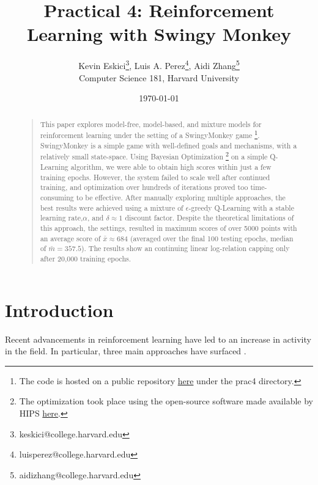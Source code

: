 \documentclass[letterpaper]{article}
\title{Practical 4: Reinforcement Learning with Swingy Monkey}
\author{Kevin Eskici\thanks{keskici@college.harvard.edu}, Luis A. Perez\thanks{luisperez@college.harvard.edu}, Aidi Zhang\thanks{aidizhang@college.harvard.edu} \\
Computer Science 181, Harvard University}
\date{\today}
\begin{document}
\maketitle

\begin{abstract}
\begin{quote}
This paper explores model-free, model-based, and mixture models for reinforcement learning under the setting of a SwingyMonkey game \footnote{The code is hosted on a public repository \href{https://github.com/kandluis/machine-learning}{here} under the prac4 directory.}. SwingyMonkey is a simple game with well-defined goals and mechanisms, with a relatively small state-space. Using Bayesian Optimization \footnote{The optimization took place using the open-source software made available by HIPS \href{https://github.com/HIPS/Spearmint}{here}.} on a simple Q-Learning algorithm, we were able to obtain high scores within just a few training epochs. However, the system failed to scale well after continued training, and optimization over hundreds of iterations proved too time-consuming to be effective. After manually exploring multiple approaches, the best results were achieved using a mixture of $\epsilon$-greedy Q-Learning with a stable learning rate,$\alpha$, and $\delta \approx 1$ discount factor. Despite the theoretical limitations of this approach, the settings, resulted in maximum scores of over 5000 points with an average score of $\bar{x} \approx 684$ (averaged over the final 100 testing epochs, median of $\bar{m} = 357.5$). The results show an continuing linear log-relation capping only after 20,000 training epochs.    
\end{quote}
\end{abstract}

\section{Introduction}
\label{sec:introduction}
Recent advancements in reinforcement learning have led to an increase in activity in the field. In particular, three main approaches have surfaced \cite{rl_lecture}. 
\end{document}
